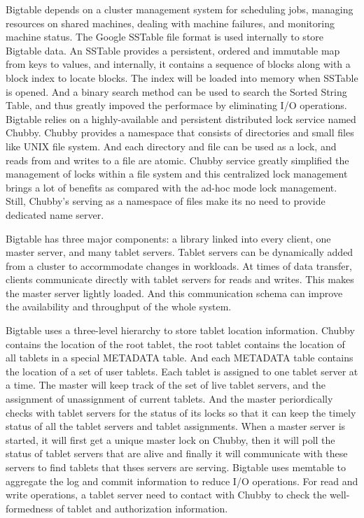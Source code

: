 \documentclass[24pt]{article}
\begin{document}
Bigtable depends on a cluster management system for scheduling jobs,
managing resources on shared machines, dealing with machine failures,
and monitoring machine status. The Google SSTable file format is used
internally to store Bigtable data. An SSTable provides a persistent,
ordered and immutable map from keys to values, and internally, it contains
a sequence of blocks along with a block index to locate blocks. The
index will be loaded into memory when SSTable is opened. And a binary
search method can be used to search the Sorted String Table, and thus
greatly impoved the performace by eliminating I/O operations. Bigtable
relies on a highly-available and persistent distributed lock service
named Chubby. Chubby provides a namespace that consists of directories
and small files like UNIX file system. And each directory and file can
be used as a lock, and reads from and writes to a file are
atomic. Chubby service greatly simplified the management of locks
within a file system and this centralized lock management brings a lot
of benefits as compared with the ad-hoc mode lock management. Still,
Chubby's serving as a namespace of files make its no need to provide
dedicated name server. 

Bigtable has three major components: a library linked
into every client, one master server, and many tablet servers. Tablet
servers can be dynamically added from a cluster to accormmodate
changes in workloads. At times of data transfer, clients communicate
directly with tablet servers for reads and writes. This makes the
master server lightly loaded. And this communication schema can
improve the availability and throughput of the whole system. 

Bigtable uses a three-level hierarchy to store tablet location
information. Chubby contains the location of the root tablet, the root
tablet contains the location of all tablets in a special METADATA
table. And each METADATA table contains the location of a set of user
tablets. Each tablet is assigned to one tablet server at a time. The
master will keep track of the set of live tablet servers, and the
assignment of unassignment of current tablets. And the master
periordically checks with tablet servers for the status of its locks
so that it can keep the timely status of all the tablet servers and
tablet assignments. When a master server is started, it will first get
a unique master lock on Chubby, then it will poll the status of tablet
servers that are alive and finally it will communicate with these
servers to find tablets that thses servers are serving.  Bigtable uses
memtable to aggregate the log and commit information to reduce I/O
operations. For read and write operations, a tablet server need to
contact with Chubby to check the well-formedness of tablet and
authorization information. 
\end{document}
